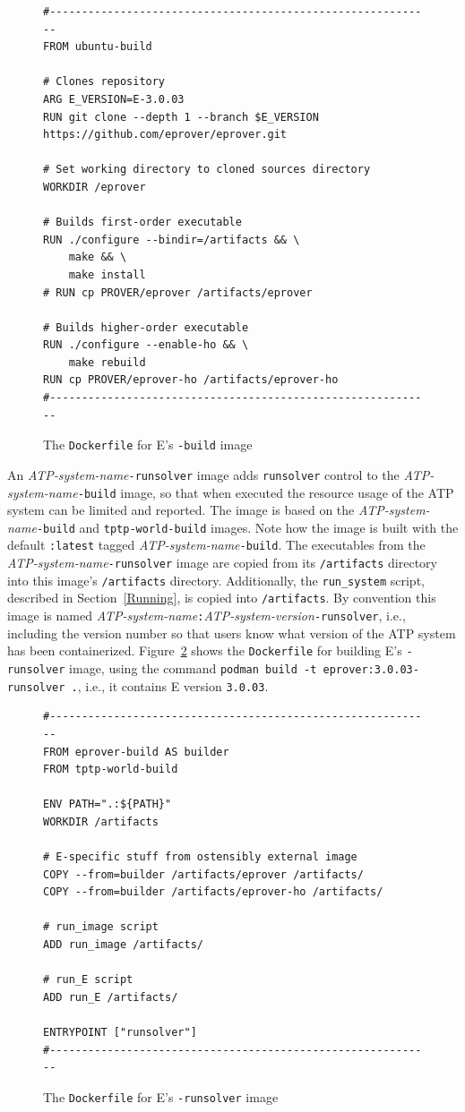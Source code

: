 \documentclass{easychair}
\begin{document}
\begin{figure}[htb]
{\small
\begin{verbatim}
#------------------------------------------------------------
FROM ubuntu-build

# Clones repository
ARG E_VERSION=E-3.0.03
RUN git clone --depth 1 --branch $E_VERSION https://github.com/eprover/eprover.git

# Set working directory to cloned sources directory
WORKDIR /eprover

# Builds first-order executable
RUN ./configure --bindir=/artifacts && \
    make && \
    make install
# RUN cp PROVER/eprover /artifacts/eprover

# Builds higher-order executable
RUN ./configure --enable-ho && \
    make rebuild
RUN cp PROVER/eprover-ho /artifacts/eprover-ho
#------------------------------------------------------------
\end{verbatim}
}
\caption{The {\tt Dockerfile} for E's {\tt -build} image}
\label{E---build}
\end{figure}

An {\em ATP-system-name}{\tt -runsolver} image adds {\tt runsolver} control to the 
{\em ATP-system-name}{\tt-build} image, so that when executed the resource usage of the
ATP system can be limited and reported.
The image is based on the {\em ATP-system-name}{\tt-build} and {\tt tptp-world-build}
images.
Note how the image is built with the default {\tt :latest} tagged 
{\em ATP-system-name}{\tt-build}. 
The executables from the {\em ATP-system-name}{\tt -runsolver} image are copied from its 
{\tt /artifacts} directory into this image's {\tt /artifacts} directory.
Additionally, the {\tt run\_system} script, described in Section~\ref{Running}, is copied into
{\tt /artifacts}.
By convention this image is named
{\em ATP-system-name}{\tt :}{\em ATP-system-version}{\tt -runsolver}, i.e., including the version
number so that users know what version of the ATP system has been containerized.
Figure~\ref{E---runsolver} shows the {\tt Dockerfile} for building E's {\tt -runsolver}
image, using the command {\tt podman~build~-t~eprover:3.0.03-runsolver~.}, i.e., it contains
E version {\tt 3.0.03}.

\begin{figure}[htb]
{\small
\begin{verbatim}
#------------------------------------------------------------
FROM eprover-build AS builder
FROM tptp-world-build

ENV PATH=".:${PATH}"
WORKDIR /artifacts

# E-specific stuff from ostensibly external image
COPY --from=builder /artifacts/eprover /artifacts/
COPY --from=builder /artifacts/eprover-ho /artifacts/

# run_image script 
ADD run_image /artifacts/

# run_E script 
ADD run_E /artifacts/

ENTRYPOINT ["runsolver"]
#------------------------------------------------------------
\end{verbatim}
}
\caption{The {\tt Dockerfile} for E's {\tt -runsolver} image}
\label{E---runsolver}
\end{figure}
\end{document}
